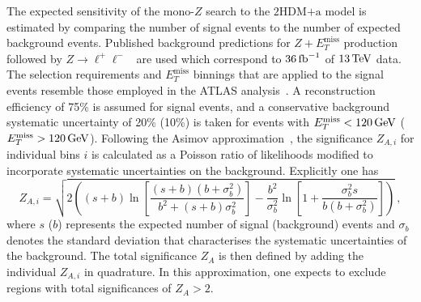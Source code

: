 \documentclass[a4paper, 11pt,notoc]{article}
\newcommand{\MET}{\ensuremath{E_T^\mathrm{miss}}\xspace}
\newcommand{\hdma}{\ensuremath{\textrm{2HDM+a}}\xspace}
\begin{document}
{\color{red} The expected sensitivity of the mono-$Z$ search to the \hdma model is estimated by comparing the number of  signal events to the number of expected background events. Published background predictions for $Z+\MET$ production followed by $Z \to \ell^+ \ell^-$~\cite{Aaboud:2017bja} are used which correspond to $36 \, {\rm fb}^{-1}$ of $13 \, {\rm TeV}$ data. The selection requirements and \MET binnings that are applied to the signal events resemble those employed in the ATLAS analysis~\cite{Aaboud:2017bja}.} A reconstruction efficiency of 75\% is assumed for signal events,  and a conservative background systematic uncertainty of 20\% (10\%) is taken for events with $\MET < 120  \, {\rm GeV}$ ($\MET > 120  \, {\rm GeV}$). Following the Asimov approximation~\cite{Cowan:2010js}, the significance $Z_{A,i}$ for individual bins $i$ is calculated as a Poisson ratio of likelihoods modified to incorporate systematic uncertainties on the background. Explicitly one has \cite{Cowan:2012}
\begin{equation}
\label{eq:significance_wsyst}
Z_{A, i} = \sqrt{ 2 \left ( \left ( s + b \right ) \ln \left [ \frac{\left (s+b \right ) \left (b + \sigma_b^2 \right )}{b^2 + \left ( s +b \right ) \sigma_b^2 } \right ]  - \frac{b^2}{\sigma_b^2} \ln \left [ 1 + \frac{\sigma_b^2 s}{b \left ( b + \sigma_b^2 \right )} \right ] \right ) } \,, 
\end{equation}
where $s$ ($b$) represents the expected number of signal (background) events and $\sigma_b$ denotes the standard deviation that characterises the systematic uncertainties of the background. The total significance $Z_A$ is then defined by adding the individual $Z_{A, i}$ in quadrature.  {\color{red} In this approximation, one expects to exclude regions with total significances of $Z_A > 2$.} %
\end{document}
